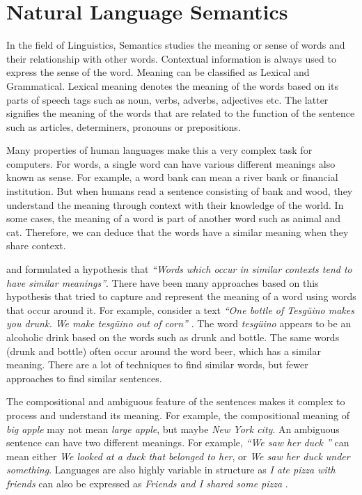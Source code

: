 \documentclass[12pt]{report} %
\begin{document}
	\section{Natural Language Semantics} 
	
	In the field of Linguistics, Semantics studies the meaning or sense of words and their relationship with other words. Contextual information is always used to express the sense of the word. Meaning can be classified as Lexical and Grammatical. Lexical meaning denotes the meaning of the words based on its parts of speech tags such as noun, verbs, adverbs, adjectives etc. The latter signifies the meaning of the words that are related to the function of the sentence such as articles, determiners, pronouns or prepositions.
	
	
	Many properties of human languages make this a very complex task for computers. For words, a single word can have various different meanings also known as sense. For example, a word bank can mean a river bank or financial institution. But when humans read a sentence consisting of bank and wood, they understand the meaning through context with their knowledge of the world. In some cases, the meaning of a word is part of another word such as animal and cat. Therefore, we can deduce that the words have a similar meaning when they share context.
	
	\cite{harris1970distributional} and \cite{firth1957synopsis} formulated a hypothesis that \textit{ \textquotedblleft Words which occur in similar contexts tend to have similar meanings\textquotedblright}. There have been many approaches based on this hypothesis that tried to capture and represent the meaning of a word using words that occur around it. For example, consider a text \textit{ \textquotedblleft One bottle of Tesgüino makes you drunk. We make tesgüino out of corn\textquotedblright} \citep{jurafsky2014speech}.  The word \textit{tesgüino}  appears to be an alcoholic drink based on the words such as drunk and bottle. The same words (drunk and bottle) often occur around the word beer, which has a similar meaning. There are a lot of techniques to find similar words, but fewer approaches to find similar sentences.
	
	
	The compositional and ambiguous feature of the sentences makes it complex to process and understand its meaning. For example, the compositional meaning of \textit{big apple} may not mean \textit{large apple}, but maybe \textit{New York city}. An ambiguous sentence can have two different meanings. For example, \textit{\textquotedblleft We saw her duck \textquotedblright} can mean either \textit{We looked at a duck that belonged to her}, or \textit{We saw her duck under something}. Languages are also highly variable in structure as \textit{I ate pizza with friends} can also be expressed as \textit{Friends and I shared some pizza} \citep{jurafsky2014speech}. %
	
\end{document}
